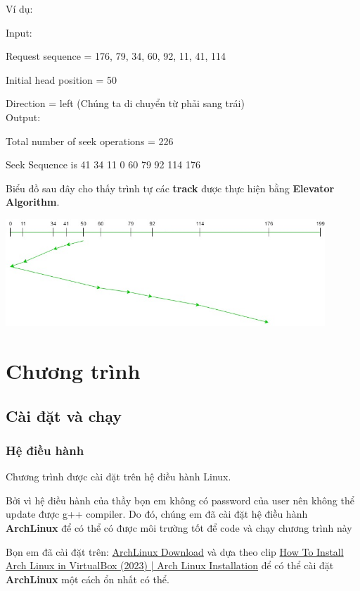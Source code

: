 \documentclass{report}
\begin{document}
    Ví dụ:

    \begin{tcolorbox}
    
        Input: 
        
        Request sequence = {176, 79, 34, 60, 92, 11, 41, 114}
        
        Initial head position = 50

        Direction = left (Chúng ta di chuyển từ phải sang trái)\\

        Output:

        Total number of seek operations = 226

        Seek Sequence is 41 34 11 0 60 79 92 114 176
    \end{tcolorbox} 

    Biểu đồ sau đây cho thấy trình tự các \textbf{track} được thực hiện bằng \textbf{Elevator Algorithm}. 

    \includegraphics[width = 12cm]{images/elevator/ele-1.jpg}
    
\chapter{Chương trình}
    \section{Cài đặt và chạy}
        \subsection{Hệ điều hành}
        Chương trình được cài đặt trên hệ điều hành Linux.
        
        Bởi vì hệ điều hành của thầy bọn em không có password của user nên không thể update được g++ compiler. Do đó, chúng em đã cài đặt hệ điều hành \textbf{ArchLinux} để có thể có được môi trường tốt để code và chạy chương trình này

        Bọn em đã cài đặt trên: \href{https://archlinux.org/download/}{ArchLinux Download} và dựa theo clip \href{https://www.youtube.com/watch?v=FlQ-LyBDCoo}{How To Install Arch Linux in VirtualBox (2023) | Arch Linux Installation} để có thể cài đặt \textbf{ArchLinux} một cách ổn nhất có thể.
\end{document}
